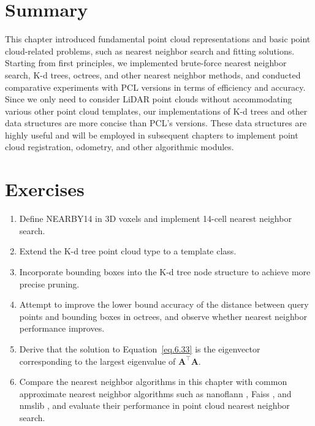 \section{Summary}
This chapter introduced fundamental point cloud representations and basic point cloud-related problems, such as nearest neighbor search and fitting solutions. Starting from first principles, we implemented brute-force nearest neighbor search, K-d trees, octrees, and other nearest neighbor methods, and conducted comparative experiments with PCL versions in terms of efficiency and accuracy. Since we only need to consider LiDAR point clouds without accommodating various other point cloud templates, our implementations of K-d trees and other data structures are more concise than PCL's versions. These data structures are highly useful and will be employed in subsequent chapters to implement point cloud registration, odometry, and other algorithmic modules.

\section*{Exercises}
\begin{enumerate}
	\item Define NEARBY14 in 3D voxels and implement 14-cell nearest neighbor search.
	\item Extend the K-d tree point cloud type to a template class.
	\item Incorporate bounding boxes into the K-d tree node structure to achieve more precise pruning.
	\item Attempt to improve the lower bound accuracy of the distance between query points and bounding boxes in octrees, and observe whether nearest neighbor performance improves.
	\item Derive that the solution to Equation~\eqref{eq.6.33} is the eigenvector corresponding to the largest eigenvalue of $\bm{A}^\top \bm{A}$.
	\item Compare the nearest neighbor algorithms in this chapter with common approximate nearest neighbor algorithms such as nanoflann \cite{Blanco2014}, Faiss \cite{Johnson2019}, and nmslib \cite{Boytsov2016}, and evaluate their performance in point cloud nearest neighbor search.
\end{enumerate}